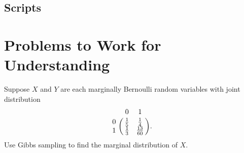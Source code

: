 \documentclass[12pt]{article}
\begin{document}
\subsection*{Scripts}



\hr

\section*{Problems to Work for Understanding}

\renewcommand{\theexerciseseries}{}
\renewcommand{\theexercise}{\arabic{exercise}}

\begin{exercise}
    Suppose \( X \) and \( Y \) are each marginally Bernoulli random
    variables with joint distribution
    \[
        \bordermatrix{
            & 0 & 1 \cr
            0 & \frac{1}{5} & \frac{1}{4} \cr
            1 & \frac{1}{3} & \frac{13}{60} }.
    \] Use Gibbs sampling to find the marginal distribution of \( X \).
\end{exercise}
\end{document}
